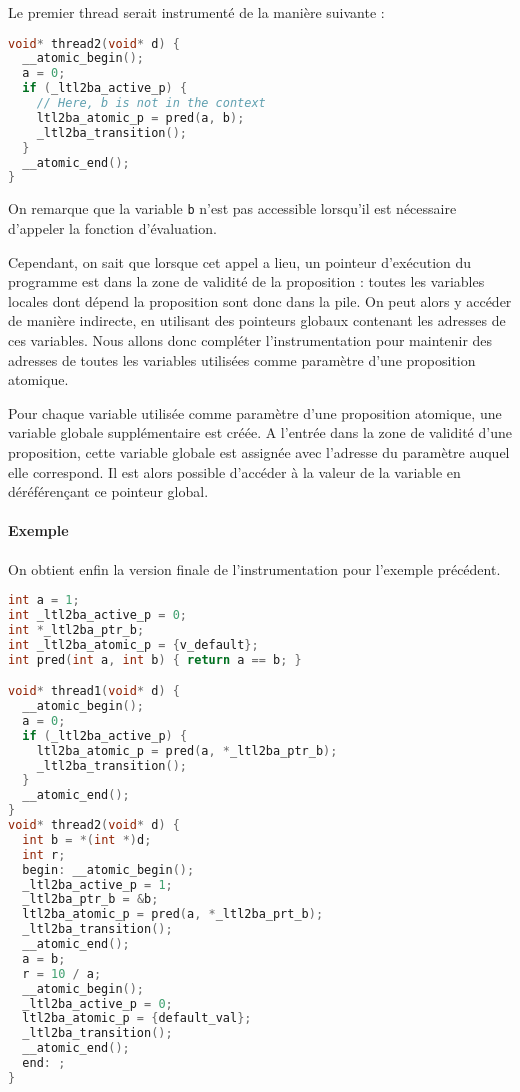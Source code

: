 Le premier thread serait instrumenté de la manière suivante :

\begin{lstlisting}[language=C, frame=single, caption=Thread 2 instrumenté]
void* thread2(void* d) {
  __atomic_begin();
  a = 0;
  if (_ltl2ba_active_p) {
    // Here, b is not in the context
    ltl2ba_atomic_p = pred(a, b);
    _ltl2ba_transition();
  }
  __atomic_end();
}
\end{lstlisting}

On remarque que la variable \texttt{b} n'est pas accessible lorsqu'il
est nécessaire d'appeler la fonction d'évaluation.

Cependant, on sait que lorsque cet appel a lieu, un pointeur d'exécution
du programme est dans la zone de validité de la proposition : toutes les
variables locales dont dépend la proposition sont donc dans la pile. On
peut alors y accéder de manière indirecte, en utilisant des pointeurs
globaux contenant les adresses de ces variables. Nous allons donc
compléter l'instrumentation pour maintenir des adresses de toutes les
variables utilisées comme paramètre d'une proposition atomique.

Pour chaque variable utilisée comme paramètre d'une proposition
atomique, une variable globale supplémentaire est créée. A l'entrée dans
la zone de validité d'une proposition, cette variable globale est
assignée avec l'adresse du paramètre auquel elle correspond. Il est
alors possible d'accéder à la valeur de la variable en déréférençant ce
pointeur global.

\paragraph{Exemple}
On obtient enfin la version finale de l'instrumentation pour l'exemple
précédent.

\begin{lstlisting}[language=C, frame=single, caption=Instrumentation finale pour
  des variables locales et globales]
int a = 1;
int _ltl2ba_active_p = 0;
int *_ltl2ba_ptr_b;
int _ltl2ba_atomic_p = {v_default};
int pred(int a, int b) { return a == b; }

void* thread1(void* d) {
  __atomic_begin();
  a = 0;
  if (_ltl2ba_active_p) {
    ltl2ba_atomic_p = pred(a, *_ltl2ba_ptr_b);
    _ltl2ba_transition();
  }
  __atomic_end();
}
void* thread2(void* d) {
  int b = *(int *)d;
  int r;
  begin: __atomic_begin();
  _ltl2ba_active_p = 1;
  _ltl2ba_ptr_b = &b;
  ltl2ba_atomic_p = pred(a, *_ltl2ba_prt_b);
  _ltl2ba_transition();
  __atomic_end();
  a = b;
  r = 10 / a;
  __atomic_begin();
  _ltl2ba_active_p = 0;
  ltl2ba_atomic_p = {default_val};
  _ltl2ba_transition();
  __atomic_end();
  end: ;
}
\end{lstlisting}

